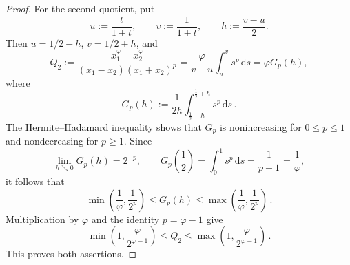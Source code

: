 \documentclass{article}
\newcommand{\lb}{\left(} %
\newcommand{\rb}{\right)} %
\newcommand{\br}[1]{\lb #1 \rb} %
\newcommand{\brOf}[1]{\!\br{#1}} %
\newcommand{\eqfs}{\,.}
\begin{document}
\begin{proof}
    For the second quotient, put
    \begin{equation}
        u:=\frac{t}{1+t},
        \qquad
        v:=\frac{1}{1+t},
        \qquad
        h:=\frac{v-u}{2}.
    \end{equation}
    Then $u=1/2-h$, $v=1/2+h$, and
    \begin{equation}
        Q_2
        :=
        \frac{x_1^\varphi-x_2^\varphi}
        {(x_1-x_2)(x_1+x_2)^p}
        =
        \frac{\varphi}{v-u}\int_u^v s^p\,\mathrm{d}s
        =
        \varphi G_p(h),
    \end{equation}
    where
    \begin{equation}
        G_p(h)
        :=
        \frac{1}{2h}
        \int_{\frac12-h}^{\frac12+h}s^p\,\mathrm{d}s
        \eqfs
    \end{equation}
    The Hermite--Hadamard inequality shows that $G_p$ is nonincreasing
    for $0\leq p\leq1$ and nondecreasing for $p\geq1$. Since
    \begin{equation}
        \lim_{h\searrow0}G_p(h)=2^{-p},
        \qquad
        G_p\brOf{\frac12}
        =
        \int_0^1s^p\,\mathrm{d}s
        =
        \frac{1}{p+1}
        =
        \frac{1}{\varphi},
    \end{equation}
    it follows that
    \begin{equation}
        \min\brOf{\frac{1}{\varphi},\frac{1}{2^p}}
        \leq G_p(h)\leq
        \max\brOf{\frac{1}{\varphi},\frac{1}{2^p}}
        \eqfs
    \end{equation}
    Multiplication by $\varphi$ and the identity $p=\varphi-1$ give
    \begin{equation}
        \min\brOf{1,\frac{\varphi}{2^{\varphi-1}}}
        \leq Q_2\leq
        \max\brOf{1,\frac{\varphi}{2^{\varphi-1}}}
        \eqfs
    \end{equation}
    This proves both assertions.
\end{proof}
%
\end{document}
